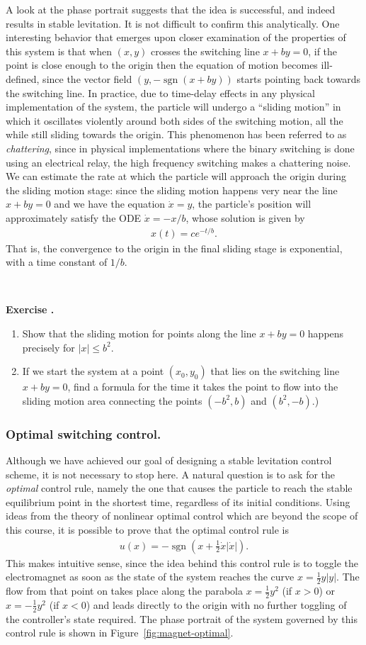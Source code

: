 \documentclass[12pt]{amsart}
\newcommand{\eqst}[1]{\begin{align*}#1\end{align*}}
\newcounter{exercise}
\newcommand{\beginexer}{\ \\ \addtocounter{exercise}{1} \textbf{Exercise \arabic{exercise}.} }
\begin{document}
A look at the phase portrait suggests that the idea is successful, and indeed results in stable levitation. It is not difficult to confirm this analytically. One interesting behavior that emerges upon closer examination of the properties of this system is that when $(x,y)$ crosses the switching line $x+by=0$, if the point is close enough to the origin then the equation of motion becomes ill-defined, since the vector field $(y,-\operatorname{sgn}(x+by))$ starts pointing back towards the switching line. In practice, due to time-delay effects in any physical implementation of the system, the particle will undergo a ``sliding motion'' in which it oscillates violently around both sides of the switching motion, all the while still sliding towards the origin. This phenomenon has been referred to as \emph{chattering}, since in physical implementations where the binary switching is done using an electrical relay, the high frequency switching makes a chattering noise. We can estimate the rate at which the particle will approach the origin during the sliding motion stage: since the sliding motion happens very near the line $x+by=0$ and we have the equation $\dot{x}=y$, the particle's position will approximately satisfy the ODE $\dot{x}=-x/b$, whose solution is given by
\eqst{
x(t) = c e^{-t/b}.
}
That is, the convergence to the origin in the final sliding stage is exponential, with a time constant of $1/b$.

\beginexer 
\begin{enumerate}
\item Show that the sliding motion for points along the line $x+by=0$ happens precisely for $|x|\le b^2$.
\item If we start the system at a point $(x_0,y_0)$ that lies on the switching line $x+by=0$, find a formula for the time it takes the point to flow into the sliding motion area connecting the points $(-b^2,b)$ and $(b^2,-b)$.)
\end{enumerate}

\subsubsection{Optimal switching control.} Although we have achieved our goal of designing a stable levitation control scheme, it is not necessary to stop here. A natural question is to ask for the \emph{optimal} control rule, namely the one that causes the particle to reach the stable equilibrium point in the shortest time, regardless of its initial conditions. Using ideas from the theory of nonlinear optimal control which are beyond the scope of this course, it is possible to prove that the optimal control rule is
\eqst{
u(x) = -\operatorname{sgn}\left(x+\tfrac12 \dot{x}|\dot{x}|\right).
}
This makes intuitive sense, since the idea behind this control rule is to toggle the electromagnet as soon as the state of the system reaches the curve $x=\tfrac12 y|y|$. The flow from that point on takes place along the parabola $x=\tfrac12 y^2$ (if $x>0$) or $x=-\tfrac12 y^2$ (if $x<0$) and leads directly to the origin with no further toggling of the controller's state required. The phase portrait of the system governed by this control rule is shown in Figure~\ref{fig:magnet-optimal}.
\end{document}

